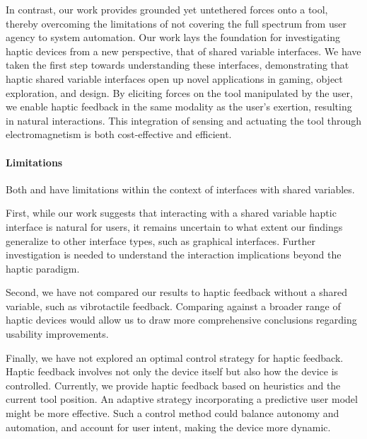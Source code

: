 In contrast, our work provides grounded yet untethered forces onto a tool, thereby overcoming the limitations of not covering the full spectrum from user agency to system automation. Our work lays the foundation for investigating haptic devices from a new perspective, that of shared variable interfaces. We have taken the first step towards understanding these interfaces, demonstrating that haptic shared variable interfaces open up novel applications in gaming, object exploration, and design. By eliciting forces on the tool manipulated by the user, we enable haptic feedback in the same modality as the user's exertion, resulting in natural interactions. This integration of sensing and actuating the tool through electromagnetism is both cost-effective and efficient.

\paragraph{Limitations}
Both \omniHap and \omniUIST have limitations within the context of interfaces with shared variables.

First, while our work suggests that interacting with a shared variable haptic interface is natural for users, it remains uncertain to what extent our findings generalize to other interface types, such as graphical interfaces. Further investigation is needed to understand the interaction implications beyond the haptic paradigm.

Second, we have not compared our results to haptic feedback without a shared variable, such as vibrotactile feedback. Comparing against a broader range of haptic devices would allow us to draw more comprehensive conclusions regarding usability improvements.

Finally, we have not explored an optimal control strategy for haptic feedback. Haptic feedback involves not only the device itself but also how the device is controlled. Currently, we provide haptic feedback based on heuristics and the current tool position. An adaptive strategy incorporating a predictive user model might be more effective. Such a control method could balance autonomy and automation, and account for user intent, making the device more dynamic.
